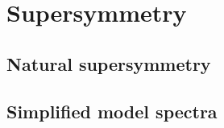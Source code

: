 \chapter{Supersymmetry \label{chap:supersymmetry}}


\section{Natural supersymmetry \label{sec:natural_susy}}



\section{Simplified model spectra \label{sec:sms}}

